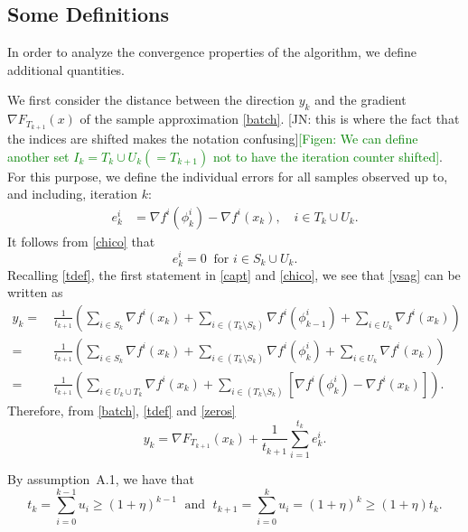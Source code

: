 \documentclass[11pt]{article}
\begin{document}
\subsection{Some Definitions}

In order to analyze the convergence properties  of the algorithm, we  define additional quantities.

We first consider the distance between the direction $y_k$ and the gradient {\color{blue} $\nabla F_{T_{k+1}}(x)$} of the sample approximation \eqref{batch}. {\color{blue} [JN: this is where the fact that the indices are shifted makes the notation confusing]}\textcolor{green}{[Figen: We can define another set $I_k=T_k\cup U_k(= T_{k+1})$ not to have the iteration counter shifted]}. For this purpose, we define the individual errors for all samples observed up to, and including,  iteration $k$:  
\begin{align} \label{eri}
 e_k^i &= \nabla f^i(\phi_{k}^i)-\nabla f^i(x_k), \quad i\in T_k \cup U_k.
\end{align}
It follows from 
\eqref{chico} that 
\begin{equation}   \label{zeros}
       e_k^i = 0 \  \mbox{ for } i \in S_k \cup U_k.
\end{equation}
%
{\color{blue} Recalling \eqref{tdef}, the first statement in \eqref{capt} and \eqref{chico}, we see that  \eqref{ysag} can be written as}
 \begin{align}  \label{gk_sag2}
       y_k = & \  \frac{1}{t_{k+1}} \left(\sum_{i \in S_k} \nabla f^i(x_{k}) +\sum_{i\in (T_k \setminus S_k)} \nabla f^i (\phi^i_{k-1}) + \sum_{i \in U_k}  \nabla f^i(x_k)\right) \\
       = & \ \frac{1}{t_{k+1}} \left(\sum_{i \in S_k} \nabla f^i(x_{k}) +\sum_{i\in (T_k \setminus S_k)} \nabla f^i (\phi^i_{k}) + \sum_{i \in U_k}  \nabla f^i(x_k)\right) \\
       = &\  \frac{1}{t_{k+1}} \left(\sum_{i \in U_k \cup T_k} \nabla f^i(x_{k}) +\sum_{i\in (T_k \setminus S_k)} [ \nabla f^i (\phi^i_{k})  -
        \nabla f^i(x_{k})] \right) .
 \end{align}
Therefore, from \eqref{batch}, \eqref{tdef} and \eqref{zeros}
\begin{equation}\label{eq:y}
 y_k = \nabla F_{T_{k+1}}(x_k) + \frac{1}{t_{k+1}}\sum_{i=1}^{t_k} e_k^i .
\end{equation}


By assumption~A.1, we have that 
\begin{equation}
	t_{k} = \sum_{i=0}^{k-1} u_i \geq (1+\eta)^{k-1} \; \mbox{ and } \; t_{k+1} = \sum_{i=0}^{k} u_i = (1+\eta)^{k} \geq (1+\eta) t_k.
	\label{kkasdf}
\end{equation}
\end{document}
